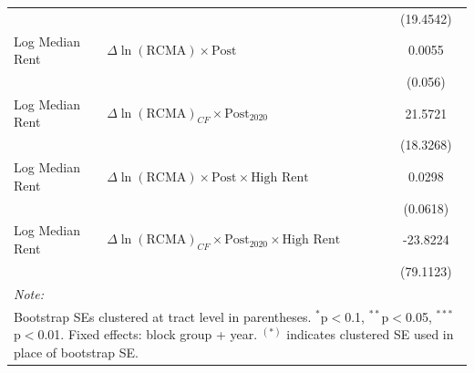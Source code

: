 \begin{table}[!h]
{\begin{tabular}[t]{llc}
 &  & (19.4542)\\
Log Median Rent & $\Delta\ln(\text{RCMA}) \times \text{Post}$ & 0.0055\\
\addlinespace
 &  & (0.056)\\
Log Median Rent & $\Delta\ln(\text{RCMA})_{CF} \times \text{Post}_{2020}$ & 21.5721\\
 &  & (18.3268)\\
Log Median Rent & $\Delta\ln(\text{RCMA}) \times \text{Post} \times \text{High Rent}$ & 0.0298\\
 &  & (0.0618)\\
\addlinespace
Log Median Rent & $\Delta\ln(\text{RCMA})_{CF} \times \text{Post}_{2020} \times \text{High Rent}$ & -23.8224\\
 &  & (79.1123)\\
\bottomrule
\multicolumn{3}{l}{\rule{0pt}{1em}\textit{Note: }}\\
\multicolumn{3}{l}{\rule{0pt}{1em}Bootstrap SEs clustered at tract level in parentheses. $^{*}$p$<$0.1, $^{**}$p$<$0.05, $^{***}$p$<$0.01. Fixed effects: block group + year. $^{(*)}$ indicates clustered SE used in place of bootstrap SE.}\\
\end{tabular}}
\end{table}
